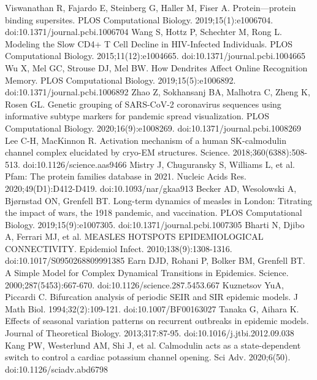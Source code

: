 \documentclass [11pt]{article}
\begin{document}
\begin{thebibliography}{99}
Viswanathan R, Fajardo E, Steinberg G, Haller M, Fiser A. Protein—protein binding supersites. PLOS Computational Biology. 2019;15(1):e1006704. doi:10.1371/journal.pcbi.1006704
Wang S, Hottz P, Schechter M, Rong L. Modeling the Slow CD4+ T Cell Decline in HIV-Infected Individuals. PLOS Computational Biology. 2015;11(12):e1004665. doi:10.1371/journal.pcbi.1004665
Wu X, Mel GC, Strouse DJ, Mel BW. How Dendrites Affect Online Recognition Memory. PLOS Computational Biology. 2019;15(5):e1006892. doi:10.1371/journal.pcbi.1006892
Zhao Z, Sokhansanj BA, Malhotra C, Zheng K, Rosen GL. Genetic grouping of SARS-CoV-2 coronavirus sequences using informative subtype markers for pandemic spread visualization. PLOS Computational Biology. 2020;16(9):e1008269. doi:10.1371/journal.pcbi.1008269
Lee C-H, MacKinnon R. Activation mechanism of a human SK-calmodulin channel complex elucidated by cryo-EM structures. Science. 2018;360(6388):508-513. doi:10.1126/science.aas9466
Mistry J, Chuguransky S, Williams L, et al. Pfam: The protein families database in 2021. Nucleic Acids Res. 2020;49(D1):D412-D419. doi:10.1093/nar/gkaa913
 Becker AD, Wesolowski A, Bjørnstad ON, Grenfell BT. Long-term dynamics of measles in London: Titrating the impact of wars, the 1918 pandemic, and vaccination. PLOS Computational Biology. 2019;15(9):e1007305. doi:10.1371/journal.pcbi.1007305
Bharti N, Djibo A, Ferrari MJ, et al. MEASLES HOTSPOTS EPIDEMIOLOGICAL CONNECTIVITY. Epidemiol Infect. 2010;138(9):1308-1316. doi:10.1017/S0950268809991385
Earn DJD, Rohani P, Bolker BM, Grenfell BT. A Simple Model for Complex Dynamical Transitions in Epidemics. Science. 2000;287(5453):667-670. doi:10.1126/science.287.5453.667
Kuznetsov YuA, Piccardi C. Bifurcation analysis of periodic SEIR and SIR epidemic models. J Math Biol. 1994;32(2):109-121. doi:10.1007/BF00163027
Tanaka G, Aihara K. Effects of seasonal variation patterns on recurrent outbreaks in epidemic models. Journal of Theoretical Biology. 2013;317:87-95. doi:10.1016/j.jtbi.2012.09.038
Kang PW, Westerlund AM, Shi J, et al. Calmodulin acts as a state-dependent switch to control a cardiac potassium channel opening. Sci Adv. 2020;6(50). doi:10.1126/sciadv.abd6798


\end{thebibliography}
\end{document}
